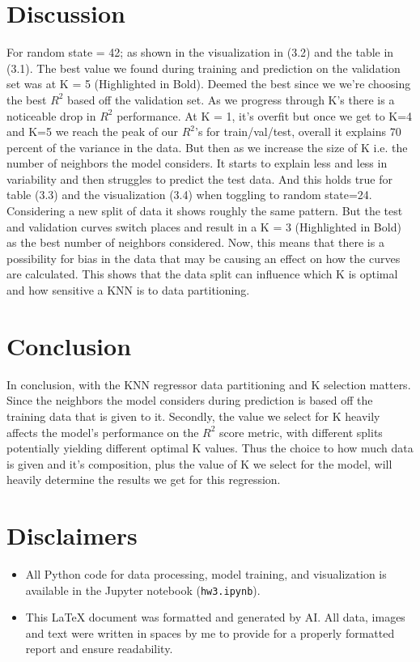 \documentclass[12pt]{article}
\begin{document}
\section{Discussion}
For random state = 42; as shown in the visualization in (3.2) and the table in (3.1). The best value we found during training and prediction on the validation set was at K = 5 (Highlighted in Bold). Deemed the best since we we're choosing the best $R^2$ based off the validation set. As we progress through K's there is a noticeable drop in $R^2$ performance. At K = 1, it's overfit but once we get to K=4 and K=5 we reach the peak of our $R^2$'s for train/val/test, overall it explains 70 percent of the variance in the data. But then as we increase the size of K i.e. the number of neighbors the model considers. It starts to explain less and less in variability and then struggles to predict the test data. And this holds true for table (3.3) and the visualization (3.4) when toggling to random state=24. Considering a new split of data it shows roughly the same pattern. But the test and validation curves switch places and result in a K = 3 (Highlighted in Bold) as the best number of neighbors considered. Now, this means that there is a possibility for bias in the data that may be causing an effect on how the curves are calculated. This shows that the data split can influence which K is optimal and how sensitive a KNN is to data partitioning.


\section{Conclusion}
In conclusion, with the KNN regressor data partitioning and K selection matters. Since the neighbors the model considers during prediction is based off the training data that is given to it. Secondly, the value we select for K heavily affects the model's performance on the $R^2$ score metric, with different splits potentially yielding different optimal K values. Thus the choice to how much data is given and it's composition, plus the value of K we select for the model, will heavily determine the results we get for this regression. 

\section{Disclaimers}
\begin{itemize}
\item All Python code for data processing, model training, and visualization is available in the Jupyter notebook (\texttt{hw3.ipynb}).
    
\item This LaTeX document was formatted and generated by AI. All data, images and text were written in spaces by me to provide for a properly formatted report and ensure readability.
\end{itemize}
\end{document}

